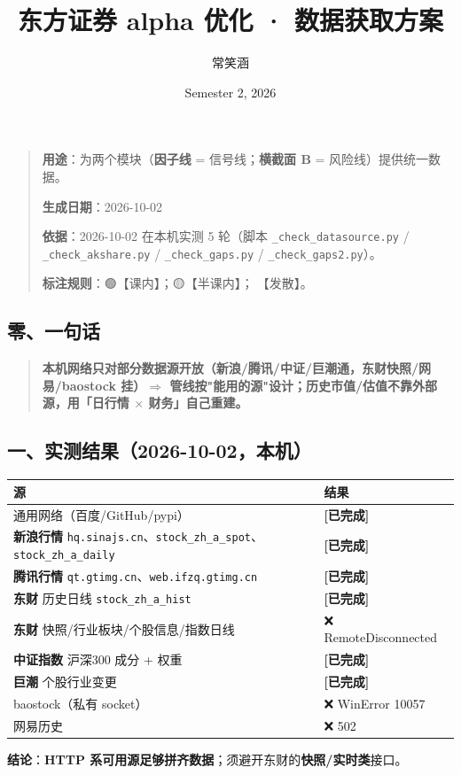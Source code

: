 \documentclass[11pt]{article}
\title{东方证券 alpha 优化 · 数据获取方案}
\author{常笑涵}
\date{Semester 2, 2026}
\begin{document}
\maketitle
\tableofcontents
\newpage
\begin{quote}
\textbf{用途}：为两个模块（\textbf{因子线} = 信号线；\textbf{横截面 B} = 风险线）提供统一数据。

\textbf{生成日期}：2026-10-02

\textbf{依据}：2026-10-02 在本机实测 5 轮（脚本 \texttt{\_check\_datasource.py} / \texttt{\_check\_akshare.py} / \texttt{\_check\_gaps.py} / \texttt{\_check\_gaps2.py}）。

\textbf{标注规则}：🟢【课内】；🟡【半课内】；🔴【发散】。
\end{quote}
\subsection{\texorpdfstring{零、一句话}{零、一句话}}
\begin{quote}
\textbf{本机网络只对部分数据源开放（新浪/腾讯/中证/巨潮通，东财快照/网易/baostock 挂）\ensuremath{\Longrightarrow} 管线按"能用的源"设计；历史市值/估值不靠外部源，用「日行情 \ensuremath{\times} 财务」自己重建。}
\end{quote}
\subsection{\texorpdfstring{一、实测结果（2026-10-02，本机）}{一、实测结果（2026-10-02，本机）}}
{\small
\begin{longtable}{p{12.29cm}p{3.91cm}}
\toprule
源 & 结果 \\
\midrule
通用网络（百度/GitHub/pypi） & \textbf{[已完成]} \\
\textbf{新浪行情} \texttt{hq.sinajs.cn}、\texttt{stock\_zh\_a\_spot}、\texttt{stock\_zh\_a\_daily} & \textbf{[已完成]} \\
\textbf{腾讯行情} \texttt{qt.gtimg.cn}、\texttt{web.ifzq.gtimg.cn} & \textbf{[已完成]} \\
\textbf{东财} 历史日线 \texttt{stock\_zh\_a\_hist} & \textbf{[已完成]} \\
\textbf{东财} 快照/行业板块/个股信息/指数日线 & ❌ RemoteDisconnected \\
\textbf{中证指数} 沪深300 成分 + 权重 & \textbf{[已完成]} \\
\textbf{巨潮} 个股行业变更 & \textbf{[已完成]} \\
baostock（私有 socket） & ❌ WinError 10057 \\
网易历史 & ❌ 502 \\
\bottomrule
\end{longtable}
}
\textbf{结论}：\textbf{HTTP 系可用源足够拼齐数据}；须避开东财的\textbf{快照/实时类}接口。
\end{document}
